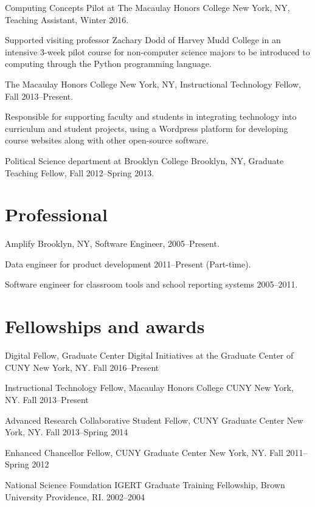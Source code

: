 \documentclass[letterpaper]{article}
\renewenvironment{itemize}{
  \begin{list}{}{
    \setlength{\leftmargin}{1.5em}
  }
}{
  \end{list}
}
\begin{document}
\begin{itemize}
    \item Computing Concepts Pilot at The Macaulay Honors College New York, NY, Teaching Assistant, Winter 2016.
      \begin{itemize}
        \item Supported visiting professor Zachary Dodd of Harvey Mudd College in an intensive 3-week pilot course for non-computer science majors to be introduced to computing through the Python programming language.
      \end{itemize}
    \item The Macaulay Honors College New York, NY, Instructional Technology Fellow, Fall 2013--Present.
      \begin{itemize}
        \item Responsible for supporting faculty and students in integrating technology into curriculum and student projects, using a Wordpress platform for developing course websites along with other open-source software.
      \end{itemize}
    \item Political Science department at Brooklyn College Brooklyn, NY, Graduate Teaching Fellow, Fall 2012--Spring 2013.
\end{itemize}

\section*{Professional}

\begin{itemize}
    \item Amplify Brooklyn, NY, Software Engineer, 2005--Present.
        \begin{itemize}
            \item Data engineer for product development 2011--Present (Part-time).
            \item Software engineer for classroom tools and school reporting systems 2005--2011.
        \end{itemize}
\end{itemize}

\section*{Fellowships and awards}
\begin{itemize}
  \item Digital Fellow, Graduate Center Digital Initiatives at the Graduate Center of CUNY New York, NY. Fall 2016--Present
  \item Instructional Technology Fellow, Macaulay Honors College CUNY New York, NY. Fall 2013--Present
  \item Advanced Research Collaborative Student Fellow, CUNY Graduate Center New York, NY. Fall 2013--Spring 2014
  \item Enhanced Chancellor Fellow, CUNY Graduate Center New York, NY. Fall 2011--Spring 2012
  \item National Science Foundation IGERT Graduate Training Fellowship, Brown University Providence, RI. 2002--2004
\end{itemize}
\end{document}
